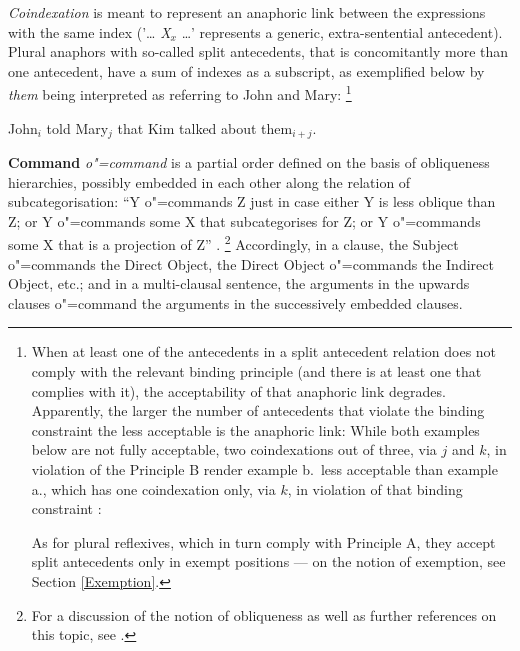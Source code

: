 \documentclass[output=paper
,modfonts
,nonflat]{langsci/langscibook}
\begin{document}
\emph{Coindexation} is meant to represent an anaphoric link between the expressions 
with the same index ('\ldots{} \emph{X}$_{x}$ \ldots{}' represents a generic, extra-sentential
antecedent). Plural anaphors with so-called split antecedents, that is concomitantly
more than one antecedent, have a sum of indexes as a subscript, as exemplified
below by \emph{them} being interpreted as referring to John and Mary:%
\footnote{
When at least one of the antecedents in a split antecedent relation does not comply
with the relevant binding principle (and there is at least one that complies with it), 
the acceptability of that anaphoric link degrades. Apparently, the larger the number 
of antecedents that violate the binding constraint the less acceptable
is the anaphoric link: While both examples below are not fully acceptable,
two coindexations out of three, via $j$ and $k$,  in violation of the Principle B
render example b.~less acceptable than example a., which has one coindexation 
only, via $k$, in violation of that binding constraint  \citep[313]{seeley93}:

\begin{exe}
\ex
\begin{xlist}
\end{xlist}
\end{exe}

As for plural reflexives, which in turn comply with Principle A, they accept split antecedents only in exempt 
positions --- on the notion of exemption, see Section \ref{Exemption}.
}

\begin{exe}
\ex John$_{i}$ told Mary$_{j}$ that Kim talked about them$_{i+j}$.
\end{exe}

\textbf{Command} \emph{o"=command} is a partial order defined on the basis of
obliqueness hierarchies, possibly embedded in each other along the relation of
subcategorisation: ``Y o"=commands Z just in case either Y is less
oblique than Z; or Y {\mbox o"=commands} some X that subcategorises for Z; or Y
o"=commands some X that is a projection of Z'' \citep[p.279]{polsag:hpsg94}.%
%
\footnote{
For a discussion of the notion of obliqueness as well as further references on
this topic, see \citep[Sec.5.2]{polsag:hpsg87}.}
Accordingly, in a clause, the Subject o"=commands the Direct Object, the Direct
Object o"=commands the Indirect Object, etc.; and in a multi-clausal sentence,
the arguments in the upwards clauses o"=command the arguments in the
successively embedded clauses.
\end{document}
